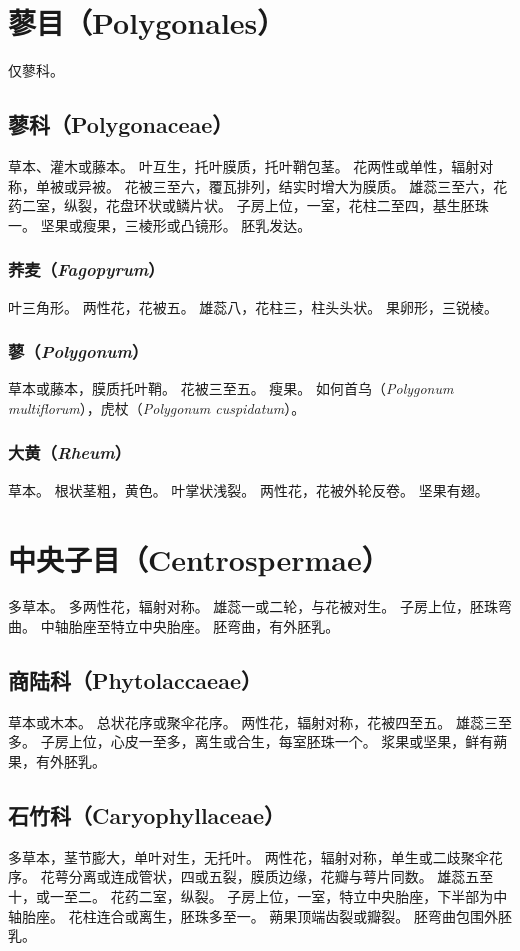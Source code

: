 \documentclass[11pt]{article}
\begin{document}
\begin{sloppypar}
\section{蓼目（Polygonales）}
仅蓼科。

\subsection{蓼科（Polygonaceae）}
草本、灌木或藤本。
叶互生，托叶膜质，托叶鞘包茎。
花两性或单性，辐射对称，单被或异被。
花被三至六，覆瓦排列，结实时增大为膜质。
雄蕊三至六，花药二室，纵裂，花盘环状或鳞片状。
子房上位，一室，花柱二至四，基生胚珠一。
坚果或瘦果，三棱形或凸镜形。
胚乳发达。

\subsubsection{荞麦（\textit{Fagopyrum}）}
叶三角形。
两性花，花被五。
雄蕊八，花柱三，柱头头状。
果卵形，三锐棱。

\subsubsection{蓼（\textit{Polygonum}）}
草本或藤本，膜质托叶鞘。
花被三至五。
瘦果。
如何首乌（\textit{Polygonum multiflorum}），虎杖（\textit{Polygonum cuspidatum}）。

\subsubsection{大黄（\textit{Rheum}）}
草本。
根状茎粗，黄色。
叶掌状浅裂。
两性花，花被外轮反卷。
坚果有翅。

\section{中央子目（Centrospermae）}
多草本。
多两性花，辐射对称。
雄蕊一或二轮，与花被对生。
子房上位，胚珠弯曲。
中轴胎座至特立中央胎座。
胚弯曲，有外胚乳。

\subsection{商陆科（Phytolaccaeae）}
草本或木本。
总状花序或聚伞花序。
两性花，辐射对称，花被四至五。
雄蕊三至多。
子房上位，心皮一至多，离生或合生，每室胚珠一个。
浆果或坚果，鲜有蒴果，有外胚乳。

\subsection{石竹科（Caryophyllaceae）}
多草本，茎节膨大，单叶对生，无托叶。
两性花，辐射对称，单生或二歧聚伞花序。
花萼分离或连成管状，四或五裂，膜质边缘，花瓣与萼片同数。
雄蕊五至十，或一至二。
花药二室，纵裂。
子房上位，一室，特立中央胎座，下半部为中轴胎座。
花柱连合或离生，胚珠多至一。
蒴果顶端齿裂或瓣裂。
胚弯曲包围外胚乳。


\end{sloppypar}
\end{document}

